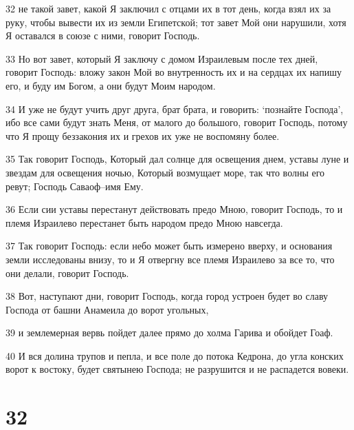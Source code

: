 \par 32 не такой завет, какой Я заключил с отцами их в тот день, когда взял их за руку, чтобы вывести их из земли Египетской; тот завет Мой они нарушили, хотя Я оставался в союзе с ними, говорит Господь.
\par 33 Но вот завет, который Я заключу с домом Израилевым после тех дней, говорит Господь: вложу закон Мой во внутренность их и на сердцах их напишу его, и буду им Богом, а они будут Моим народом.
\par 34 И уже не будут учить друг друга, брат брата, и говорить: `познайте Господа', ибо все сами будут знать Меня, от малого до большого, говорит Господь, потому что Я прощу беззакония их и грехов их уже не воспомяну более.
\par 35 Так говорит Господь, Который дал солнце для освещения днем, уставы луне и звездам для освещения ночью, Который возмущает море, так что волны его ревут; Господь Саваоф--имя Ему.
\par 36 Если сии уставы перестанут действовать предо Мною, говорит Господь, то и племя Израилево перестанет быть народом предо Мною навсегда.
\par 37 Так говорит Господь: если небо может быть измерено вверху, и основания земли исследованы внизу, то и Я отвергну все племя Израилево за все то, что они делали, говорит Господь.
\par 38 Вот, наступают дни, говорит Господь, когда город устроен будет во славу Господа от башни Анамеила до ворот угольных,
\par 39 и землемерная вервь пойдет далее прямо до холма Гарива и обойдет Гоаф.
\par 40 И вся долина трупов и пепла, и все поле до потока Кедрона, до угла конских ворот к востоку, будет святынею Господа; не разрушится и не распадется вовеки.

\chapter{32}

